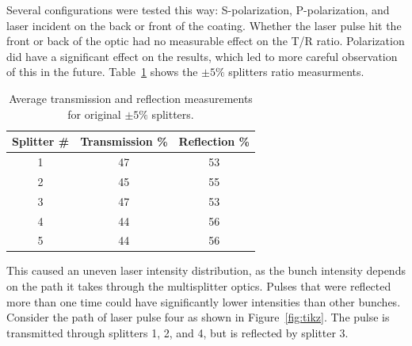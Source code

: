 Several configurations were tested this way: S-polarization, P-polarization, 
and laser incident on the back or front of the coating. 
Whether the laser pulse hit the front or back of the optic
had no measurable effect on the T/R ratio. Polarization did have a significant effect on
the results, which led to more careful observation of this in the future.
Table~\ref{tab:reflection} shows the $\pm 5\%$ splitters ratio measurments. 
\begin{table}%
	\begin{center}
		\caption{Average transmission and reflection measurements for original $\pm 5\%$ splitters.}
		\label{tab:reflection}
		\begin{tabular}{ccc}
			\toprule
			\toprule
			\textbf{Splitter \#} & \textbf{Transmission \%}  & \textbf{Reflection \%} \\ \hline
			1 &  47  &  53   \\ %
			2 &  45  &  55   \\ %
			3 &  47  &  53   \\		 
			4 &  44  & 	56	\\
			5 &  44  &  56   \\ \hline
		\end{tabular}	
	\end{center}
\end{table}
This caused an uneven laser intensity distribution, as the bunch intensity depends on the path 
it takes through the multisplitter optics. Pulses that were reflected more than one
time could have significantly lower intensities than other bunches. 
Consider the path of laser pulse four as shown in Figure~\ref{fig:tikz}. 
The pulse is transmitted through splitters 1, 2, and 4, but is reflected by splitter 3.
\def \delayvertical {1.5}
\def \delayoneleft {7.5}
\def \delaytworight{15}
\def \mycenter{10.0}
\def \labels{6.5}
\def \sone {-0.5}
\def \stwo {\sone+1.5}
\def \sthree {\stwo+1.5}
\def \sfour {\sthree+1.5}
\def \buffer{-4.5}
